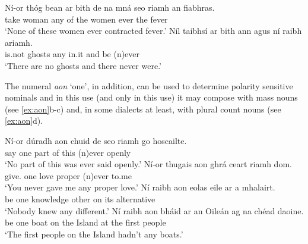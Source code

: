 \documentclass[output=paper,colorlinks,citecolor=brown]{langscibook}
\begin{document}
\ea\label{ex:goodbody.again}
\ea
\gll Ní-or thóg bean {ar bith} de na mná seo riamh an fiabhras. \\
    {\nior} {take\past} woman any of the women {\seo} ever the fever \\
\glt `None of these women ever contracted fever.'\label{ex:ariamh1}
\ex
\gll Níl taibhsí {ar bith} ann agus ní raibh ariamh. \\
    {is.not} ghosts any in.it and {\no} {be\past} (n)ever \\
\glt `There are no ghosts and there never were.'\label{ex:ariamh2}
\z
\z


The numeral \textit{aon} `one', in addition, can be used to determine polarity sensitive nominals and in this use (and only in this use) it may compose with mass nouns (see \ref{ex:aon}b-c) and, in some dialects at least, with plural count nouns (see \ref{ex:aon}d). 

\ea\label{ex:aon}
\ea
\gll Ní-or dúradh aon chuid de seo riamh {go hoscailte}. \\
    {\nior} {say\pastaut} one part of this (n)ever openly \\
\glt `No part of this was ever said openly.' \label{ex:ariamh3}
\ex
\gll Ní-or thugais aon ghrá ceart riamh dom. \\
    {\nior} {give\past.\your} one love proper (n)ever to.me \\
\glt `You never gave me any proper love.' \label{ex:ariamh4}
\ex
\gll Ní raibh aon eolas eile ar a mhalairt. \\
     {\no} {be\past} one knowledge other on its alternative \\
\glt `Nobody knew any different.'
\ex
\gll Ní raibh aon bháid ar an Oileán ag na chéad daoine. \\
     {\no} {be\past} one {boat\pl} on the Island at the first people \\
\glt `The first people on the Island hadn't any boats.'
\z
\z
\end{document}

